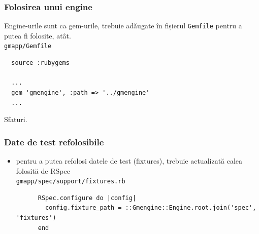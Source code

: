 \documentclass[compress]{beamer}
\begin{document}
\begin{frame}[fragile]
\frametitle{Folosirea unui engine}
Engine-urile sunt ca gem-urile, trebuie adăugate în fișierul \texttt{Gemfile} pentru a putea fi folosite, atât.
\\
\small\texttt{gmapp/Gemfile}
\begin{verbatim}
  source :rubygems

  ...
  gem 'gmengine', :path => '../gmengine'
  ...
\end{verbatim}
\end{frame}

\begin{frame}
  \begin{center}
  \huge Sfaturi.
  \end{center}
\end{frame}

\begin{frame}[fragile]
\frametitle{Date de test refolosibile}
\begin{itemize}
  \item pentru a putea refolosi datele de test (fixtures), trebuie actualizată calea folosită de RSpec
    \\
    \texttt{gmapp/spec/support/fixtures.rb}
    \begin{verbatim}
      RSpec.configure do |config|
        config.fixture_path = ::Gmengine::Engine.root.join('spec', 'fixtures')
      end
    \end{verbatim}
\end{itemize}
\end{frame}
\end{document}
